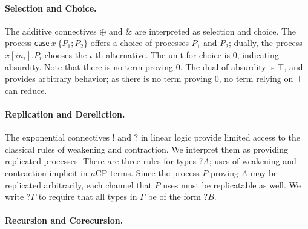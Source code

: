 \documentclass[orivec,envcountsame]{llncs}
\newcommand{\with}{\mathbin\binampersand}
\newcommand{\cpbang}[1]{{! #1}}
\newcommand{\cpquery}[1]{{? #1}}
\newcommand{\mkwd}[1]{\mathsf{#1}}
\newcommand{\clabel}[1]{\mathit{#1}}
\renewcommand{\case}[2]{\mkwd{case}\:#1\:\{#2\}}
\newcommand{\sel}[2]{#1[\clabel{#2}]}
\newcommand{\mucp}{$\mu\mathrm{CP}$\xspace}
\begin{document}
\paragraph{Selection and Choice.}

The additive connectives $\oplus$ and $\with$ are interpreted as selection and choice. The process
$\case{x}{P_1;P_2}$ offers a choice of processes $P_1$ and $P_2$; dually, the process
$\sel{x}{in_i}.P_i$ chooses the $i$-th alternative. The unit for choice is $0$, indicating
absurdity. Note that there is no term proving $0$. The dual of absurdity is $\top$, and provides
arbitrary behavior; as there is no term proving $0$, no term relying on $\top$ can reduce.

\paragraph{Replication and Dereliction.}

The exponential connectives $!$ and $?$ in linear logic provide limited access to the classical
rules of weakening and contraction.  We interpret them as providing replicated processes.
There are three rules for types $\cpquery{A}$; uses of weakening and contraction implicit in \mucp
terms. Since the process $P$ proving $A$ may be replicated arbitrarily, each channel that $P$ uses
must be replicatable as well.  We write $\cpquery{\Gamma}$ to require that all types in $\Gamma$ be
of the form $\cpquery{B}$.

\paragraph{Recursion and Corecursion.}
\end{document}
